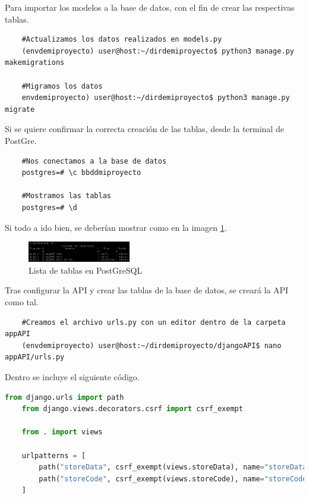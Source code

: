Para importar los modelos a la base de datos, con el fin de crear las respectivas tablas.

\begin{verbatim}
	#Actualizamos los datos realizados en models.py
	(envdemiproyecto) user@host:~/dirdemiproyecto$ python3 manage.py makemigrations
	
	#Migramos los datos
	envdemiproyecto) user@host:~/dirdemiproyecto$ python3 manage.py migrate
\end{verbatim}

Si se quiere confirmar la correcta creación de las tablas, desde la terminal de PostGre.

\begin{verbatim}
	#Nos conectamos a la base de datos
	postgres=# \c bbddmiproyecto
	
	#Mostramos las tablas
	postgres=# \d
\end{verbatim}

Si todo a ido bien, se deberían mostrar como en la imagen \ref{fig:ej34}.

\begin{figure} [H]
	\centering
	\includegraphics[width=0.4\textwidth]{fig/comprobacionTablasBBDD.png}
	\caption[Lista de tablas en PostGreSQL]{Lista de tablas en PostGreSQL}
	\label{fig:ej34}
\end{figure}

Tras configurar la API y crear las tablas de la base de datos, se creará la API como tal.

\begin{verbatim}
	#Creamos el archivo urls.py con un editor dentro de la carpeta appAPI
	(envdemiproyecto) user@host:~/dirdemiproyecto/djangoAPI$ nano appAPI/urls.py
\end{verbatim}

Dentro se incluye el siguiente código.

\begin{lstlisting}[language=Python, caption={Modelos Django}]
	from django.urls import path
	from django.views.decorators.csrf import csrf_exempt
	
	from . import views

	urlpatterns = [
		path("storeData", csrf_exempt(views.storeData), name="storeData"),
		path("storeCode", csrf_exempt(views.storeCode), name="storeCode"),
	]
\end{lstlisting}

